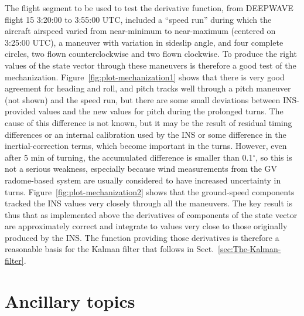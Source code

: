 \documentclass[12pt,twoside,english,12pt,twoside,english]{article}\usepackage[]{graphicx}\usepackage[]{color}
\let\stdsection\section
\renewcommand{\section}{\newpage\stdsection}
\let\OrgIndex\index
\renewcommand*{\index}[1]{\OrgIndex{#1}}
\begin{document}
The
flight segment to be used to test the derivative function,
from DEEPWAVE flight 15 3:20:00
to 3:55:00 UTC, included a ``speed run''
during which the aircraft airspeed varied from near-minimum
to near-maximum (centered on 3:25:00 UTC), a maneuver with variation
in sideslip angle, and four complete circles,
two flown counterclockwise and two flown clockwise. To produce the
right values of the state vector through these
maneuvers is therefore a good test of the mechanization. Figure~\ref{fig:plot-mechanization1}
shows that there is very good agreement for heading and roll, and
pitch tracks well through a pitch maneuver (not shown) and the speed
run, but there are some small deviations between INS-provided values
and the new values for pitch during the prolonged turns. The cause
of this difference is not known, but it may be the result of residual
timing differences or an internal calibration used by the INS or some
difference in the inertial-correction
terms, which become important in the turns. However, even after 5
min of turning, the accumulated difference is smaller than 0.1$^{\circ}$,
so this is not a serious weakness, especially because wind measurements
from the GV radome-based system are usually
considered to have increased uncertainty in turns. Figure~\ref{fig:plot-mechanization2}
shows that the ground-speed components tracked
the INS values very closely through all the maneuvers. The key result
is thus that as implemented above the derivatives of components of
the state vector are approximately correct and integrate to values
very close to those originally produced by the INS. The function
providing those derivatives is therefore
a reasonable basis for the Kalman filter that
follows in Sect.~\ref{sec:The-Kalman-filter}.

\section{Ancillary topics}
\end{document}
